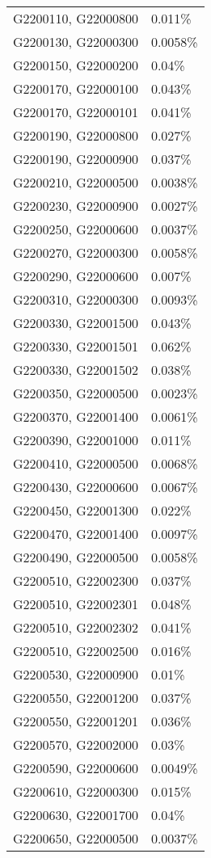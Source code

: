 \begin{longtable}[]{@{}ll@{}}
G2200110, G22000800 & 0.011\% \\
G2200130, G22000300 & 0.0058\% \\
G2200150, G22000200 & 0.04\% \\
G2200170, G22000100 & 0.043\% \\
G2200170, G22000101 & 0.041\% \\
G2200190, G22000800 & 0.027\% \\
G2200190, G22000900 & 0.037\% \\
G2200210, G22000500 & 0.0038\% \\
G2200230, G22000900 & 0.0027\% \\
G2200250, G22000600 & 0.0037\% \\
G2200270, G22000300 & 0.0058\% \\
G2200290, G22000600 & 0.007\% \\
G2200310, G22000300 & 0.0093\% \\
G2200330, G22001500 & 0.043\% \\
G2200330, G22001501 & 0.062\% \\
G2200330, G22001502 & 0.038\% \\
G2200350, G22000500 & 0.0023\% \\
G2200370, G22001400 & 0.0061\% \\
G2200390, G22001000 & 0.011\% \\
G2200410, G22000500 & 0.0068\% \\
G2200430, G22000600 & 0.0067\% \\
G2200450, G22001300 & 0.022\% \\
G2200470, G22001400 & 0.0097\% \\
G2200490, G22000500 & 0.0058\% \\
G2200510, G22002300 & 0.037\% \\
G2200510, G22002301 & 0.048\% \\
G2200510, G22002302 & 0.041\% \\
G2200510, G22002500 & 0.016\% \\
G2200530, G22000900 & 0.01\% \\
G2200550, G22001200 & 0.037\% \\
G2200550, G22001201 & 0.036\% \\
G2200570, G22002000 & 0.03\% \\
G2200590, G22000600 & 0.0049\% \\
G2200610, G22000300 & 0.015\% \\
G2200630, G22001700 & 0.04\% \\
G2200650, G22000500 & 0.0037\% \\

\end{longtable}
